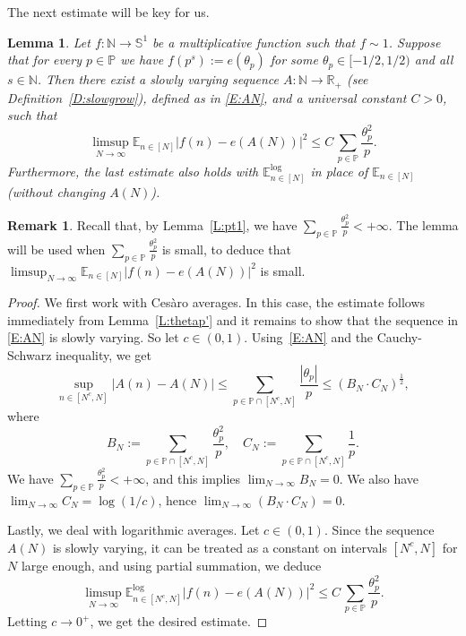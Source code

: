 \documentclass[11pt]{amsart}
\newtheorem{lemma}{Lemma}[section]
\theoremstyle{definition}
\newtheorem*{remark}{Remark}
\newcommand{\lE}{\mathbb{E}^{\log}}
\newcommand{\E}{{\mathbb E}}
\newcommand{\N}{{\mathbb N}}
\renewcommand{\P}{{\mathbb P}}
\newcommand{\R}{{\mathbb R}}
\renewcommand{\S}{\mathbb{S}}
\begin{document}
	 The next estimate will be key for us.
	 	\begin{lemma}\label{L:thetap}
	 		Let  $f\colon \N\to \S^1$ be a multiplicative function  such that $f\sim 1$. Suppose that  for every $p\in \P$ we have  $f(p^s):=e(\theta_p)$ for some $\theta_p\in [-1/2,1/2)$ and all  $s\in \N$.  Then there exist a slowly varying  sequence  $A\colon \N\to \R_+$ (see Definition~\ref{D:slowgrow}), defined as in   \eqref{E:AN},  and a universal constant $C>0$, such that
	 		$$
	 		\limsup_{N\to \infty}	\E_{n\in [N]}|f(n)-e(A(N))|^2\leq  C \,	\sum_{p \in \P} \frac{\theta_p^2}{p}.
	 		$$	
	 		Furthermore, the last estimate also holds with $\lE_{n\in[N]}$ in place of $\E_{n\in[N]}$ (without changing $A(N)$).
	 	\end{lemma}
	 	\begin{remark}
	 	Recall that, by Lemma~\ref{L:pt1}, we have 	$\sum_{p\in \P}\frac{\theta_p^2}{p}<+\infty$. The lemma will be used when $\sum_{p \in \P} \frac{\theta_p^2}{p}$ is small,  to deduce that  $\limsup_{N\to \infty}	\E_{n\in [N]}|f(n)-e(A(N))|^2$ is small.
	 	\end{remark}
	 	\begin{proof}
	 		We first work with   Ces\`aro averages.	In this case, the estimate follows immediately from Lemma~\ref{L:thetap'} and it remains to show that the sequence in \eqref{E:AN} is slowly varying.
	 		So let $c\in (0,1)$.  Using~\eqref{E:AN} and the  Cauchy-Schwarz inequality, we get
	 		$$
	 		\sup_{n\in [N^c,N]}|A(n)-A(N)|\leq \sum_{p\in \P\cap [N^c,N]}\frac{|\theta_p|}{p}\leq (B_N\cdot C_N)^{\frac{1}{2}},
	 		$$
	 		where
	 		$$
	 		B_N:=\sum_{p\in \P\cap [N^c,N]}\frac{\theta^2_p}{p}, \quad   C_N:=\sum_{p\in \P\cap [N^c,N]}\frac{1}{p}.
	 		$$
	 	We have 	$\sum_{p\in \P}\frac{\theta_p^2}{p}<+\infty$, and this implies  $\lim_{N\to\infty}B_N=0$. We also have $\lim_{N\to\infty}C_N=\log(1/c)$, hence $\lim_{N\to\infty}(B_N\cdot C_N)=0$.
	 		
	 		Lastly, we deal with logarithmic averages. Let $c\in (0,1)$.
	 		Since the sequence $A(N)$ is slowly varying, it can be treated as a constant on intervals $[N^c,N]$ for $N$ large enough, and   using partial summation, we deduce
	 		$$
	 		\limsup_{N\to \infty}	\lE_{n\in [N^c,N]}|f(n)-e(A(N))|^2\leq  C \,	\sum_{p \in \P} \frac{\theta_p^2}{p}.
	 		$$	
	 		Letting $c\to 0^+$, we get the desired estimate.
	 	\end{proof}
	 	
\end{document}
